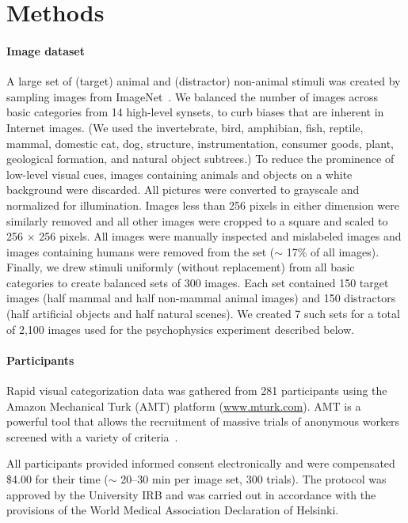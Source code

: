 \documentclass{article}
\begin{document}
\section{Methods}




\paragraph{Image dataset}
A large set of (target) animal and (distractor) non-animal stimuli was created by sampling images from ImageNet~\citep{deng2009imagenet}. We balanced the number of images across basic categories from 14 high-level synsets, to curb biases that are inherent in Internet images. (We used the invertebrate, bird, amphibian, fish, reptile, mammal, domestic cat, dog, structure, instrumentation, consumer goods, plant, geological formation, and natural object subtrees.) To reduce the prominence of low-level visual cues, images containing animals and objects on a white background were discarded. All pictures were converted to grayscale and normalized for illumination. Images less than 256 pixels in either dimension were similarly removed and all other images were cropped to a square and scaled to 256 $\times$ 256 pixels. All images were manually inspected and mislabeled images and images containing humans were removed from the set ($\sim$ 17\% of all images). Finally, we drew stimuli uniformly (without replacement) from all basic categories to create balanced sets of 300 images. Each set contained 150 target images (half mammal and half non-mammal animal images) and 150 distractors (half artificial objects and half natural scenes). We created 7 such sets for a total of 2,100 images used for the psychophysics experiment described below.  






\paragraph{Participants}


Rapid visual categorization data was gathered from 281 participants using the Amazon Mechanical Turk (AMT) platform (\url{www.mturk.com}). AMT is a powerful tool that allows the recruitment of massive trials of anonymous workers screened with a variety of criteria~\citep{Crump2013}. 






All participants provided informed consent electronically and were compensated \$4.00 for their time ($\sim$ 20–30 min per image set, 300 trials). The protocol was approved by the University IRB and was carried out in accordance with the provisions of the World Medical Association Declaration of Helsinki.
\end{document}
